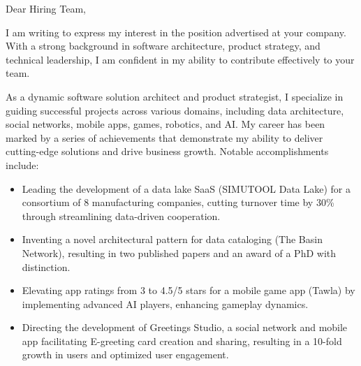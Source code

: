 \clearpage
{}




\vspace{4ex}

Dear Hiring Team,

\vspace{2ex}

I am writing to express my interest in the position advertised at your company. With a strong background in software architecture, product strategy, and technical leadership, I am confident in my ability to contribute effectively to your team.

As a dynamic software solution architect and product strategist, I specialize in guiding successful projects across various domains, including data architecture, social networks, mobile apps, games, robotics, and AI. My career has been marked by a series of achievements that demonstrate my ability to deliver cutting-edge solutions and drive business growth. Notable accomplishments include:

\vspace{2ex}

\begin{itemize}
    \item Leading the development of a data lake SaaS (SIMUTOOL Data Lake) for a consortium of 8 manufacturing companies, cutting turnover time by 30\% through streamlining data-driven cooperation.
    \item Inventing a novel architectural pattern for data cataloging (The Basin Network), resulting in two published papers and an award of a PhD with distinction.
    \item Elevating app ratings from 3 to 4.5/5 stars for a mobile game app (Tawla) by implementing advanced AI players, enhancing gameplay dynamics.
    \item Directing the development of Greetings Studio, a social network and mobile app facilitating E-greeting card creation and sharing, resulting in a 10-fold growth in users and optimized user engagement.
\end{itemize}

